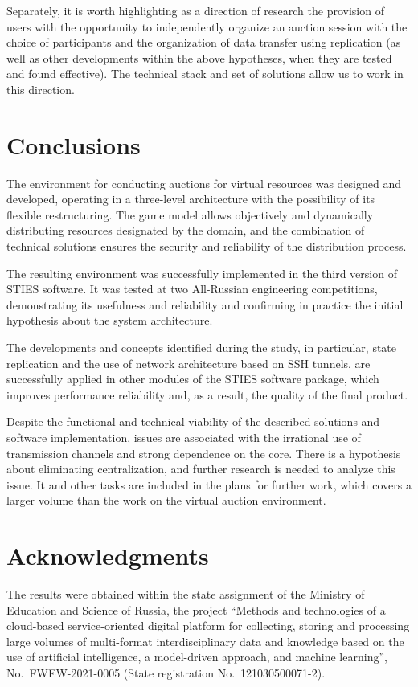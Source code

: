 \documentclass[
]{ceurart}
\begin{document}
Separately, it is worth highlighting as a direction of research the provision of users with the opportunity to independently organize an auction session with the choice of participants and the organization of data transfer using replication (as well as other developments within the above hypotheses, when they are tested and found effective). The technical stack and set of solutions allow us to work in this direction.


\section*{Conclusions}
\label{sec:conc}

The environment for conducting auctions for virtual resources was designed and developed, operating in a three-level architecture with the possibility of its flexible restructuring. The game model allows objectively and dynamically distributing resources designated by the domain, and the combination of technical solutions ensures the security and reliability of the distribution process.

The resulting environment was successfully implemented in the third version of STIES software. It was tested at two All-Russian engineering competitions, demonstrating its usefulness and reliability and confirming in practice the initial hypothesis about the system architecture.

The developments and concepts identified during the study, in particular, state replication and the use of network architecture based on SSH tunnels, are successfully applied in other modules of the STIES software package, which improves performance reliability and, as a result, the quality of the final product.

Despite the functional and technical viability of the described solutions and software implementation, issues are associated with the irrational use of transmission channels and strong dependence on the core. There is a hypothesis about eliminating centralization, and further research is needed to analyze this issue. It and other tasks are included in the plans for further work, which covers a larger volume than the work on the virtual auction environment.



\section*{Acknowledgments}
\label{sec:acq}

The results were obtained within the state assignment of the Ministry of Education and Science of Russia, the project ``Methods and technologies of a cloud-based service-oriented digital platform for collecting, storing and processing large volumes of multi-format interdisciplinary data and knowledge based on the use of artificial intelligence, a model-driven approach, and machine learning'', No.~FWEW-2021-0005 (State registration No.~121030500071-2).
\end{document}
